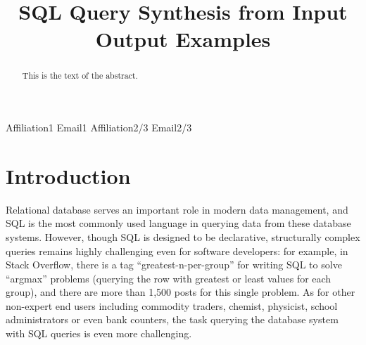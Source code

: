 \documentclass[preprint]{sigplanconf}
\begin{document}

\setlength{\pdfpageheight}{\paperheight}
\setlength{\pdfpagewidth}{\paperwidth}




\title{SQL Query Synthesis from Input Output Examples}

           {Affiliation1}
           {Email1}
           {Affiliation2/3}
           {Email2/3}

\maketitle

\begin{abstract}
This is the text of the abstract.
\end{abstract}




\section{Introduction}

Relational database serves an important role in modern data management, and SQL is the most commonly used language in querying data from these database systems. However, though SQL is designed to be declarative, structurally complex queries remains highly challenging even for software developers: for example, in Stack Overflow, there is a tag ``greatest-n-per-group'' for writing SQL to solve ``argmax'' problems (querying the row with greatest or least values for each group), and there are more than 1,500 posts for this single problem. As for other non-expert end users including commodity traders, chemist, physicist, school administrators or even bank counters, the task querying the database system with SQL queries is even more challenging.
\end{document}

